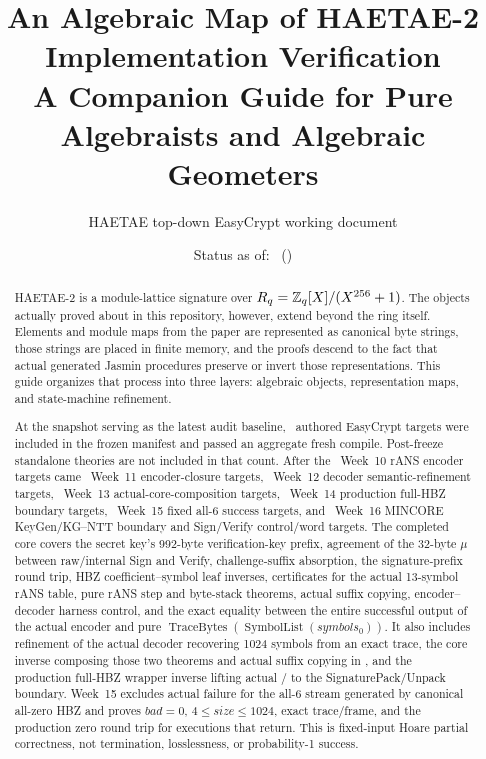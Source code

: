 \documentclass[11pt,a4paper]{article}
\title{\textbf{An Algebraic Map of HAETAE-2 Implementation Verification}\\[0.4em]
  \Large A Companion Guide for Pure Algebraists and Algebraic Geometers}
\author{HAETAE top-down EasyCrypt working document}
\date{Status as of: \SnapshotDate\ (\SnapshotWeek)}
\begin{document}
\maketitle

\begin{abstract}
HAETAE-2 is a module-lattice signature over
\(R_q=\mathbb{Z}_q[X]/(X^{256}+1)\).
The objects actually proved about in this repository, however, extend beyond
the ring itself. Elements and module maps from the paper are represented as
canonical byte strings, those strings are placed in finite memory, and the
proofs descend to the fact that actual generated Jasmin procedures preserve
or invert those representations. This guide organizes that process into three
layers: algebraic objects, representation maps, and state-machine refinement.

At the snapshot serving as the latest audit baseline, \AuthoredTargetCount\
authored EasyCrypt targets were included in the frozen manifest and passed
an aggregate \identifier{-no-eco} fresh compile. Post-freeze standalone
theories are not included in that count.
After the \WeekTenTargetCount\ Week~10 rANS encoder targets came
\WeekElevenTargetCount\ Week~11 encoder-closure targets,
\WeekTwelveTargetCount\ Week~12 decoder semantic-refinement targets,
\WeekThirteenTargetCount\ Week~13 actual-core-composition targets,
\WeekFourteenTargetCount\ Week~14 production full-HBZ boundary targets,
\WeekFifteenTargetCount\ Week~15 fixed all-6 success targets, and
\WeekSixteenTargetCount\ Week~16 MINCORE KeyGen/KG--NTT boundary and
Sign/Verify control/word targets.
The completed core covers the secret key's 992-byte verification-key prefix,
agreement of the 32-byte \(\mu\) between raw/internal Sign and Verify,
challenge-suffix absorption, the signature-prefix round trip, HBZ
coefficient--symbol leaf inverses, certificates for the actual 13-symbol rANS
table, pure rANS step and byte-stack theorems, actual suffix copying,
encoder--decoder harness control, and the exact equality between the entire
successful output of the actual encoder and pure
\(\operatorname{TraceBytes}(\operatorname{SymbolList}(symbols_0))\).
It also includes refinement of the actual decoder recovering 1024 symbols from
an exact trace, the core inverse composing those two theorems and actual suffix
copying in \identifier{Mode2RansActualHarness.run}, and the production full-HBZ
wrapper inverse lifting actual
/
to the SignaturePack/Unpack boundary. Week~15 excludes actual failure for the
all-6 stream generated by canonical all-zero HBZ and proves \(bad=0\),
\(4\le size\le1024\), exact trace/frame, and the production zero round trip
for executions that return. This is fixed-input Hoare partial correctness,
not termination, losslessness, or probability-1 success.


\end{abstract}
\end{document}
